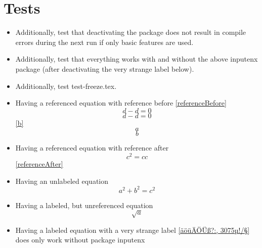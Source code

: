 \documentclass{article}
\begin{document}

	\section*{Tests}
	\begin{itemize}
		\item Additionally, test that deactivating the package does not result in compile errors during the next run if only basic features are used.
		\item Additionally, test that everything works with and without the above inputenx package (after deactivating the very strange label below).
		\item Additionally, test test-freeze.tex.
		\item Having a referenced equation with reference before \ref{referenceBefore}
			\begin{equation}\label{referenceBefore}
				d - d = 0
			\end{equation}
			\begin{equation}\label{referenceNo}
				d - d = 0
			\end{equation}
		\ref{b}\begin{equation}\label{a}a\end{equation}\begin{equation}\label{b}b\end{equation}
		\item Having a referenced equation with reference after
			\begin{equation}\label{referenceAfter}
				c^2 = c c
			\end{equation}
			\ref{referenceAfter}
		\item Having an unlabeled equation
			\begin{equation}\label{abc}
				a^2 + b^2 = c^2
			\end{equation}
		\item Having a labeled, but unreferenced equation
			\begin{equation}\label{unreferenced}
				\sqrt{a}
			\end{equation}
		\item Having a labeled equation with a very strange label \ref{äöüÄÖÜß?:, 3075µ!/§} does only work without package inputenx

\end{itemize}
\end{document}
